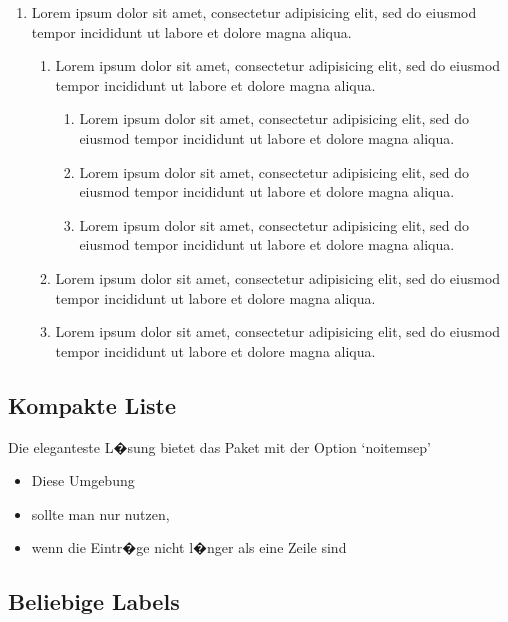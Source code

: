 \begin{enumerate}
   \item Lorem ipsum dolor sit amet, consectetur adipisicing elit, sed do eiusmod tempor incididunt ut labore et dolore magna aliqua.
%
   \begin{enumerate}
      \item Lorem ipsum dolor sit amet, consectetur adipisicing elit, sed do eiusmod tempor incididunt ut labore et dolore magna aliqua.
      \begin{enumerate}
         \item Lorem ipsum dolor sit amet, consectetur adipisicing elit, sed do eiusmod tempor incididunt ut labore et dolore magna aliqua.
         \item Lorem ipsum dolor sit amet, consectetur adipisicing elit, sed do eiusmod tempor incididunt ut labore et dolore magna aliqua.
         \item Lorem ipsum dolor sit amet, consectetur adipisicing elit, sed do eiusmod tempor incididunt ut labore et dolore magna aliqua.
      \end{enumerate}
      \item Lorem ipsum dolor sit amet, consectetur adipisicing elit, sed do eiusmod tempor incididunt ut labore et dolore magna aliqua.
      \item Lorem ipsum dolor sit amet, consectetur adipisicing elit, sed do eiusmod tempor incididunt ut labore et dolore magna aliqua.
   \end{enumerate}
\end{enumerate}

%
\subsection{Kompakte Liste}

Die eleganteste L�sung bietet das Paket  mit der Option `noitemsep'
\begin{itemize}[noitemsep]
\item Diese Umgebung
\item sollte man nur nutzen,
\item wenn die Eintr�ge nicht l�nger als eine Zeile sind
\end{itemize}

\subsection{Beliebige Labels}

